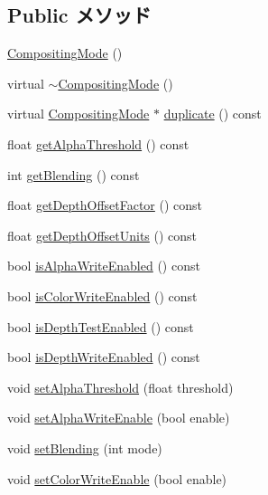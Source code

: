 \subsection*{Public メソッド}
\begin{CompactItemize}
\item 
\hyperlink{classm3g_1_1CompositingMode_5abfd1a798f1327aac4b92f55d4ecc0c}{CompositingMode} ()
\item 
virtual \hyperlink{classm3g_1_1CompositingMode_0bba5b15be7249e946c9aaf94631ce3b}{$\sim$CompositingMode} ()
\item 
virtual \hyperlink{classm3g_1_1CompositingMode}{CompositingMode} $\ast$ \hyperlink{classm3g_1_1CompositingMode_ab6fcd945b68728bbe2c65a8f45dc8dd}{duplicate} () const 
\item 
float \hyperlink{classm3g_1_1CompositingMode_19ab71363ea77fa86aa6fafce87f06cb}{getAlphaThreshold} () const 
\item 
int \hyperlink{classm3g_1_1CompositingMode_078954de3d786bd11dc98b06f237bbbb}{getBlending} () const 
\item 
float \hyperlink{classm3g_1_1CompositingMode_d24a4116e72678164f31d7a48f74be6b}{getDepthOffsetFactor} () const 
\item 
float \hyperlink{classm3g_1_1CompositingMode_add4c6c3bc01c1d0689e0588af79039f}{getDepthOffsetUnits} () const 
\item 
bool \hyperlink{classm3g_1_1CompositingMode_bfcec134f769763d492011fc8ccadcce}{isAlphaWriteEnabled} () const 
\item 
bool \hyperlink{classm3g_1_1CompositingMode_35ffa21944393c774552003dd2cb03ea}{isColorWriteEnabled} () const 
\item 
bool \hyperlink{classm3g_1_1CompositingMode_4dd97b29a6e12c5e64477ab1546f93f1}{isDepthTestEnabled} () const 
\item 
bool \hyperlink{classm3g_1_1CompositingMode_0ee4c812abd4a99e0373158d36dc45d9}{isDepthWriteEnabled} () const 
\item 
void \hyperlink{classm3g_1_1CompositingMode_6becafaefd18a2b8b1adeba491576837}{setAlphaThreshold} (float threshold)
\item 
void \hyperlink{classm3g_1_1CompositingMode_5204f1acac056f82d322262703be67b0}{setAlphaWriteEnable} (bool enable)
\item 
void \hyperlink{classm3g_1_1CompositingMode_4c09465dfec9efa000c115c5c2867b63}{setBlending} (int mode)
\item 
void \hyperlink{classm3g_1_1CompositingMode_84f7cba08f5a2bea05de4fc3154a50b2}{setColorWriteEnable} (bool enable)

\end{CompactItemize}
